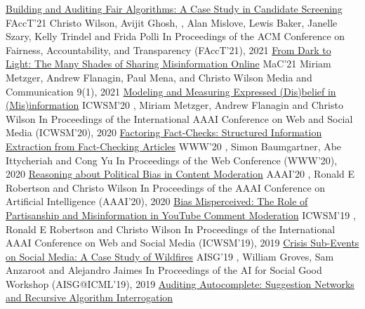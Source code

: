 \documentclass[letterpaper]{awesome-cv}
\begin{document}
\addvspace{2ex}
\begin{cventries}
  \cvpubadmin
    {\href{https://shanjiang.me/publications/facct21_paper.pdf}{Building and Auditing Fair Algorithms: A Case Study in Candidate Screening}}
    {FAccT'21}
    {Christo Wilson, Avijit Ghosh, , Alan Mislove, Lewis Baker, Janelle Szary, Kelly Trindel and Frida Polli}
    {In Proceedings of the ACM Conference on Fairness, Accountability, and Transparency (FAccT’21), 2021}
  \cvpubadmin
    {\href{https://shanjiang.me/publications/mac21_paper.pdf}{From Dark to Light: The Many Shades of Sharing Misinformation Online}}
    {MaC'21}
    {Miriam Metzger, Andrew Flanagin, Paul Mena,  and Christo Wilson}
    {Media and Communication 9(1), 2021}
  \cvpubadmin
    {\href{https://shanjiang.me/publications/icwsm20_paper.pdf}{Modeling and Measuring Expressed (Dis)belief in (Mis)information}}
    {ICWSM'20}
    {, Miriam Metzger, Andrew Flanagin and Christo Wilson}
    {In Proceedings of the International AAAI Conference on Web and Social Media (ICWSM’20), 2020}
  \cvpubadmin
    {\href{https://shanjiang.me/publications/www20_paper.pdf}{Factoring Fact-Checks: Structured Information Extraction from Fact-Checking Articles}}
    {WWW'20}
    {, Simon Baumgartner, Abe Ittycheriah and Cong Yu}
    {In Proceedings of the Web Conference (WWW’20), 2020}
  \cvpubadmin
    {\href{https://shanjiang.me/publications/aaai20_paper.pdf}{Reasoning about Political Bias in Content Moderation}}
    {AAAI'20}
    {, Ronald E Robertson and Christo Wilson}
    {In Proceedings of the AAAI Conference on Artificial Intelligence (AAAI’20), 2020}
  \cvpubadmin
    {\href{https://shanjiang.me/publications/icwsm19_paper.pdf}{Bias Misperceived: The Role of Partisanship and Misinformation in YouTube Comment Moderation}}
    {ICWSM'19}
    {, Ronald E Robertson and Christo Wilson}
    {In Proceedings of the International AAAI Conference on Web and Social Media (ICWSM’19), 2019}
  \cvpubadmin
    {\href{https://shanjiang.me/publications/aisg19_paper.pdf}{Crisis Sub-Events on Social Media: A Case Study of Wildfires}}
    {AISG'19}
    {, William Groves, Sam Anzaroot and Alejandro Jaimes}
    {In Proceedings of the AI for Social Good Workshop (AISG@ICML’19), 2019}
  \cvpubadmin
    {\href{https://shanjiang.me/publications/websci19_paper.pdf}{Auditing Autocomplete: Suggestion Networks and Recursive Algorithm Interrogation}}

\end{cventries}
\end{document}
